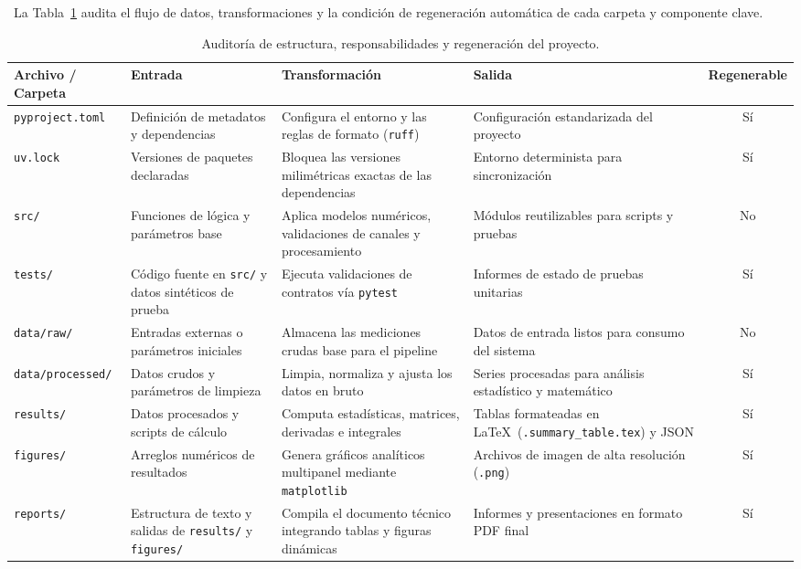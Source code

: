 \documentclass[11pt,a4paper]{article}
\begin{document}
\noindent\ La Tabla~\ref{tab:auditoria} audita el flujo de datos, transformaciones y la condición de regeneración automática de cada carpeta y componente clave.

\begin{table}[htbp]
  \centering
  \caption{Auditoría de estructura, responsabilidades y regeneración del proyecto.}
  \label{tab:auditoria}
  \small
  \begin{tabular}{p{2.5cm} p{3.2cm} p{3.2cm} p{3.2cm} c}
    \toprule
    \textbf{Archivo / Carpeta} & \textbf{Entrada} & \textbf{Transformación} & \textbf{Salida} & \textbf{Regenerable} \\
    \midrule
    \texttt{pyproject.toml} & Definición de metadatos y dependencias & Configura el entorno y las reglas de formato (\texttt{ruff}) & Configuración estandarizada del proyecto & Sí \\
    \addlinespace
    \texttt{uv.lock} & Versiones de paquetes declaradas & Bloquea las versiones milimétricas exactas de las dependencias & Entorno determinista para sincronización & Sí \\
    \addlinespace
    \texttt{src/} & Funciones de lógica y parámetros base & Aplica modelos numéricos, validaciones de canales y procesamiento & Módulos reutilizables para scripts y pruebas & No \\
    \addlinespace
    \texttt{tests/} & Código fuente en \texttt{src/} y datos sintéticos de prueba & Ejecuta validaciones de contratos vía \texttt{pytest} & Informes de estado de pruebas unitarias & Sí \\
    \addlinespace
    \texttt{data/raw/} & Entradas externas o parámetros iniciales & Almacena las mediciones crudas base para el pipeline & Datos de entrada listos para consumo del sistema & No \\
    \addlinespace
    \texttt{data/processed/} & Datos crudos y parámetros de limpieza & Limpia, normaliza y ajusta los datos en bruto & Series procesadas para análisis estadístico y matemático & Sí \\
    \addlinespace
    \texttt{results/} & Datos procesados y scripts de cálculo & Computa estadísticas, matrices, derivadas e integrales & Tablas formateadas en \LaTeX\ (\texttt{.summary\_table.tex}) y JSON & Sí \\
    \addlinespace
    \texttt{figures/} & Arreglos numéricos de resultados & Genera gráficos analíticos multipanel mediante \texttt{matplotlib} & Archivos de imagen de alta resolución (\texttt{.png}) & Sí \\
    \addlinespace
    \texttt{reports/} & Estructura de texto y salidas de \texttt{results/} y \texttt{figures/} & Compila el documento técnico integrando tablas y figuras dinámicas & Informes y presentaciones en formato PDF final & Sí \\
    \bottomrule
  \end{tabular}
\end{table}
\end{document}
